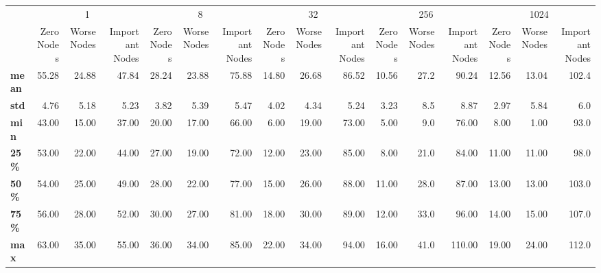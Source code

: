 \begin{tabular}{lrrrrrrrrrrrrrrr}
\toprule
{} & \multicolumn{3}{c}{1} & \multicolumn{3}{c}{8} & \multicolumn{3}{c}{32} & \multicolumn{3}{c}{256} & \multicolumn{3}{c}{1024} \\
{} & Zero Nodes & Worse Nodes & Important Nodes & Zero Nodes & Worse Nodes & Important Nodes & Zero Nodes & Worse Nodes & Important Nodes & Zero Nodes & Worse Nodes & Important Nodes & Zero Nodes & Worse Nodes & Important Nodes \\
\midrule
\textbf{mean} &      55.28 &       24.88 &           47.84 &      28.24 &       23.88 &           75.88 &      14.80 &       26.68 &           86.52 &      10.56 &        27.2 &           90.24 &      12.56 &       13.04 &           102.4 \\
\textbf{std } &       4.76 &        5.18 &            5.23 &       3.82 &        5.39 &            5.47 &       4.02 &        4.34 &            5.24 &       3.23 &         8.5 &            8.87 &       2.97 &        5.84 &             6.0 \\
\textbf{min } &      43.00 &       15.00 &           37.00 &      20.00 &       17.00 &           66.00 &       6.00 &       19.00 &           73.00 &       5.00 &         9.0 &           76.00 &       8.00 &        1.00 &            93.0 \\
\textbf{25\% } &      53.00 &       22.00 &           44.00 &      27.00 &       19.00 &           72.00 &      12.00 &       23.00 &           85.00 &       8.00 &        21.0 &           84.00 &      11.00 &       11.00 &            98.0 \\
\textbf{50\% } &      54.00 &       25.00 &           49.00 &      28.00 &       22.00 &           77.00 &      15.00 &       26.00 &           88.00 &      11.00 &        28.0 &           87.00 &      13.00 &       13.00 &           103.0 \\
\textbf{75\% } &      56.00 &       28.00 &           52.00 &      30.00 &       27.00 &           81.00 &      18.00 &       30.00 &           89.00 &      12.00 &        33.0 &           96.00 &      14.00 &       15.00 &           107.0 \\
\textbf{max } &      63.00 &       35.00 &           55.00 &      36.00 &       34.00 &           85.00 &      22.00 &       34.00 &           94.00 &      16.00 &        41.0 &          110.00 &      19.00 &       24.00 &           112.0 \\
\bottomrule
\end{tabular}

